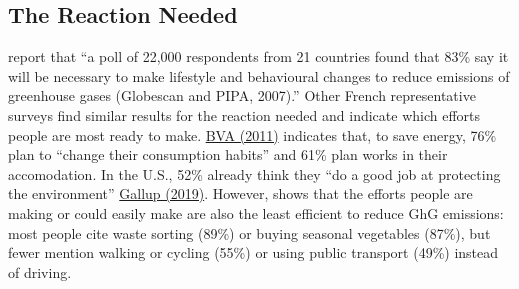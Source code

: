 \documentclass[11pt]{article}
\begin{document}
    \subsection{The Reaction Needed\label{subsec:reaction}}

\citet{kallbekken_aasen_2010} report that ``a poll of 22,000 respondents from 21 countries found that 83\% say it will be necessary to make lifestyle and behavioural changes to reduce emissions of greenhouse gases (Globescan and PIPA, 2007).'' Other French representative surveys find similar results for the reaction needed and indicate which efforts people are most ready to make. \href{http://www.bva.fr/data/sondage/sondage_fiche/1063/fichier_bva_actuc0a25.pdf }{BVA (2011)} indicates that, to save energy, 76\% plan to ``change their consumption habits'' and 61\% plan works in their accomodation. In the U.S., 52\% already think they ``do a good job at protecting the environment'' \href{https://news.gallup.com/poll/1615/environment.aspx}{Gallup (2019)}. However, \citet{ademe_representations_2018} shows that the efforts people are making or could easily make are also the least efficient to reduce GhG emissions: most people cite waste sorting (89\%) or buying seasonal vegetables (87\%), but fewer mention walking or cycling (55\%) or using public transport (49\%) instead of driving. 


\end{document}
